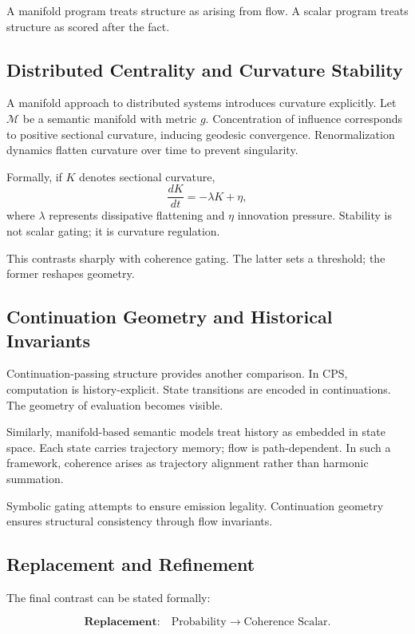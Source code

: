 \documentclass[12pt]{article}
\begin{document}
A manifold program treats structure as arising from flow. A scalar program treats structure as scored after the fact.

\subsection{Distributed Centrality and Curvature Stability}

A manifold approach to distributed systems introduces curvature explicitly. Let $\mathcal{M}$ be a semantic manifold with metric $g$. Concentration of influence corresponds to positive sectional curvature, inducing geodesic convergence. Renormalization dynamics flatten curvature over time to prevent singularity.

Formally, if $K$ denotes sectional curvature,
\[
  \frac{dK}{dt} = -\lambda K + \eta,
\]
where $\lambda$ represents dissipative flattening and $\eta$ innovation pressure. Stability is not scalar gating; it is curvature regulation.

This contrasts sharply with coherence gating. The latter sets a threshold; the former reshapes geometry.

\subsection{Continuation Geometry and Historical Invariants}

Continuation-passing structure provides another comparison. In CPS, computation is history-explicit. State transitions are encoded in continuations. The geometry of evaluation becomes visible.

Similarly, manifold-based semantic models treat history as embedded in state space. Each state carries trajectory memory; flow is path-dependent. In such a framework, coherence arises as trajectory alignment rather than harmonic summation.

Symbolic gating attempts to ensure emission legality. Continuation geometry ensures structural consistency through flow invariants.

\subsection{Replacement and Refinement}

The final contrast can be stated formally:

\[
  \textbf{Replacement:}
  \quad
  \text{Probability} \rightarrow \text{Coherence Scalar}.
\]
\end{document}
